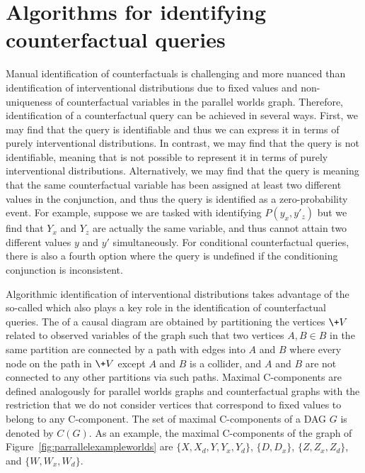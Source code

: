 \section{Algorithms for identifying counterfactual queries} \label{sec:algo}

Manual identification of counterfactuals is challenging and more nuanced than identification of interventional distributions due to fixed values and non-uniqueness of counterfactual variables in the parallel worlds graph. Therefore, identification of a counterfactual query can be achieved in several ways. First, we may find that the query is identifiable and thus we can express it in terms of purely interventional distributions. In contrast, we may find that the query is not identifiable, meaning that is not possible to represent it in terms of purely interventional distributions. Alternatively, we may find that the query is  meaning that the same counterfactual variable has been assigned at least two different values in the conjunction, and thus the query is identified as a zero-probability event. For example, suppose we are tasked with identifying \(P(y_x, y'_z)\) but we find that \(Y_x\) and \(Y_z\) are actually the same variable, and thus cannot attain two different values \(y\) and \(y'\) simultaneously. For conditional counterfactual queries, there is also a fourth option where the query is undefined if the conditioning conjunction is inconsistent.

Algorithmic identification of interventional distributions takes advantage of the so-called  \citep{tian2002general, shpitser2006id} which also plays a key role in the identification of counterfactual queries. The  of a causal diagram are obtained by partitioning the vertices \(\+ V\) related to observed variables of the graph such that two vertices \(A, B \in B\) in the same partition are connected by a path with edges into \(A\) and \(B\) where every node on the path in \(\+ V\) except \(A\) and \(B\) is a collider, and \(A\) and \(B\) are not connected to any other partitions via such paths. Maximal C-components are defined analogously for parallel worlds graphs and counterfactual graphs with the restriction that we do not consider vertices that correspond to fixed values to belong to any C-component. The set of maximal C-components of a DAG \(G\) is denoted by \(C(G)\). As an example, the maximal C-components of the graph of Figure~\ref{fig:parrallelexampleworlds} are \(\{X, X_d, Y, Y_x, Y_d\}\), \(\{D, D_x\}\), \(\{Z, Z_x, Z_d\}\), and \(\{W, W_x, W_d\}\).

